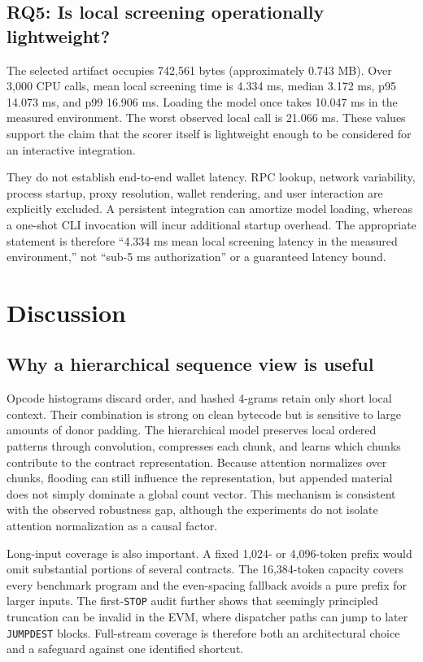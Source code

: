 \documentclass[conference]{IEEEtran}
\newcommand{\code}[1]{\texttt{#1}}
\begin{document}


\subsection{RQ5: Is local screening operationally lightweight?}

The selected artifact occupies 742,561 bytes (approximately 0.743 MB). Over 3,000 CPU calls, mean
local screening time is 4.334 ms, median 3.172 ms, p95 14.073 ms, and p99 16.906 ms. Loading the
model once takes 10.047 ms in the measured environment. The worst observed local call is 21.066
ms. These values support the claim that the scorer itself is lightweight enough to be considered
for an interactive integration.

They do not establish end-to-end wallet latency. RPC lookup, network variability, process
startup, proxy resolution, wallet rendering, and user interaction are explicitly excluded. A
persistent integration can amortize model loading, whereas a one-shot CLI invocation will incur
additional startup overhead. The appropriate statement is therefore ``4.334 ms mean local
screening latency in the measured environment,'' not ``sub-5 ms authorization'' or a guaranteed
latency bound.

\section{Discussion}
\label{sec:discussion}

\subsection{Why a hierarchical sequence view is useful}

Opcode histograms discard order, and hashed 4-grams retain only short local context. Their
combination is strong on clean bytecode but is sensitive to large amounts of donor padding. The
hierarchical model preserves local ordered patterns through convolution, compresses each chunk,
and learns which chunks contribute to the contract representation. Because attention normalizes
over chunks, flooding can still influence the representation, but appended material does not
simply dominate a global count vector. This mechanism is consistent with the observed robustness
gap, although the experiments do not isolate attention normalization as a causal factor.

Long-input coverage is also important. A fixed 1,024- or 4,096-token prefix would omit substantial
portions of several contracts. The 16,384-token capacity covers every benchmark program and the
even-spacing fallback avoids a pure prefix for larger inputs. The first-\code{STOP} audit further
shows that seemingly principled truncation can be invalid in the EVM, where dispatcher paths can
jump to later \code{JUMPDEST} blocks. Full-stream coverage is therefore both an architectural
choice and a safeguard against one identified shortcut.
\end{document}
